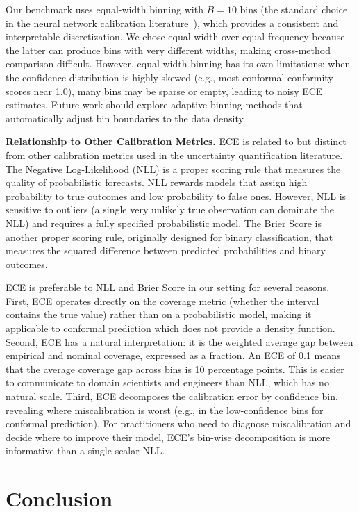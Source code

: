 \documentclass[12pt,a4paper]{article}
\theoremstyle{plain}
\begin{document}
Our benchmark uses equal-width binning with $B=10$ bins (the standard choice in
the neural network calibration literature~\citep{guo2017calibration}), which
provides a consistent and interpretable discretization. We chose equal-width
over equal-frequency because the latter can produce bins with very different
widths, making cross-method comparison difficult. However, equal-width binning
has its own limitations: when the confidence distribution is highly skewed
(e.g., most conformal conformity scores near 1.0), many bins may be sparse or
empty, leading to noisy ECE estimates. Future work should explore adaptive
binning methods that automatically adjust bin boundaries to the data density.

\textbf{Relationship to Other Calibration Metrics.}
ECE is related to but distinct from other calibration metrics used in the
uncertainty quantification literature. The Negative Log-Likelihood (NLL) is
a proper scoring rule that measures the quality of probabilistic forecasts.
NLL rewards models that assign high probability to true outcomes and low
probability to false ones. However, NLL is sensitive to outliers (a single
very unlikely true observation can dominate the NLL) and requires a fully
specified probabilistic model. The Brier Score is another proper scoring rule,
originally designed for binary classification, that measures the squared
difference between predicted probabilities and binary outcomes.

ECE is preferable to NLL and Brier Score in our setting for several reasons.
First, ECE operates directly on the coverage metric (whether the interval
contains the true value) rather than on a probabilistic model, making it
applicable to conformal prediction which does not provide a density function.
Second, ECE has a natural interpretation: it is the weighted average gap
between empirical and nominal coverage, expressed as a fraction. An ECE of
0.1 means that the average coverage gap across bins is 10 percentage points.
This is easier to communicate to domain scientists and engineers than NLL,
which has no natural scale. Third, ECE decomposes the calibration error by
confidence bin, revealing where miscalibration is worst (e.g., in the low-confidence
bins for conformal prediction). For practitioners who need to diagnose
miscalibration and decide where to improve their model, ECE's bin-wise
decomposition is more informative than a single scalar NLL.

\section{Conclusion}
\label{sec:conclusion}
\end{document}
